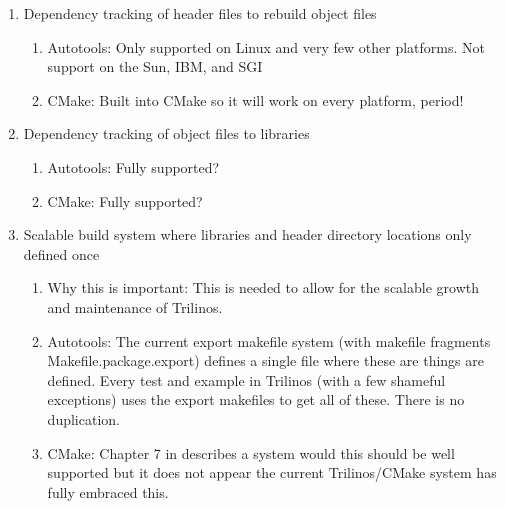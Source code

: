 \documentclass[pdf,ps2pdf,11pt]{SANDreport}
\begin{document}
\begin{enumerate}

{}\item Dependency tracking of header files to rebuild object files

  \begin{enumerate}

  {}\item Autotools: Only supported on Linux and very few other
  platforms.  Not support on the Sun, IBM, and SGI

  {}\item CMake: Built into CMake so it will work on every platform,
  period!

  \end{enumerate}

{}\item Dependency tracking of object files to libraries

  \begin{enumerate}

  {}\item Autotools: Fully supported?

  {}\item CMake: Fully supported?

  \end{enumerate}

{}\item Scalable build system where libraries and header directory
locations only defined once

  \begin{enumerate}

  {}\item Why this is important: This is needed to allow for the
  scalable growth and maintenance of Trilinos.

  {}\item Autotools: The current export makefile system (with
  makefile fragments Makefile.package.export) defines a single file
  where these are things are defined.  Every test and example in
  Trilinos (with a few shameful exceptions) uses the export
  makefiles to get all of these.  There is no duplication.

  {}\item CMake: Chapter 7 in {}\cite{MasteringCMake_fourth}
  describes a system would this should be well supported but it does
  not appear the current Trilinos/CMake system has fully embraced
  this.

  \end{enumerate}


\end{enumerate}
\end{document}
